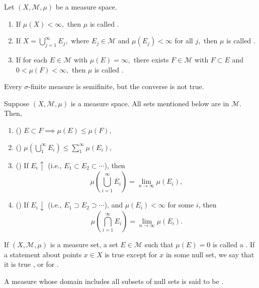 \documentclass[12pt]{article}	%
\begin{document}
\begin{defn}
	Let $(X, \mathcal{M}, \mu)$ be a measure space.
	\begin{enumerate}
		\item If $\mu(X) < \infty,$ then $\mu$ is called .
		\item If $X = \bigcup_{j = 1}^\infty E_j,$ where $E_j \in \mathcal{M}$ and $\mu(E_j) < \infty$ for all $j,$ then $\mu$ is called .
		\item If for each $E \in \mathcal{M}$ with $\mu(E) = \infty,$ there exists $F \in \mathcal{M}$ with $F \subset E$ and $0 < \mu(F) < \infty,$ then $\mu$ is called .
	\end{enumerate}
\end{defn}

\begin{exe}
	Every $\sigma$-finite measure is semifinite, but the converse is not true.
\end{exe}

\begin{prop}
	Suppose $(X, \mathcal{M}, \mu)$ is a measure space. All sets mentioned below are in $\mathcal{M}.$ Then,
	\begin{enumerate}
		\item () $E \subset F \implies \mu(E) \le \mu(F),$
		\item () $\mu\left(\bigcup_{1}^\infty E_i\right) \le \sum_{1}^{\infty} \mu(E_i),$
		\item () If $E_i \uparrow$ (i.e., $E_1 \subset E_2 \subset \cdots$), then
		\begin{equation*} 
			\mu\left(\bigcup_{i = 1}^\infty E_i\right) = \lim_{n\to \infty} \mu(E_i),
		\end{equation*}
		\item () If $E_i \downarrow$ (i.e., $E_1 \supset E_2 \supset \cdots$), and $\mu(E_{i}) < \infty$ for some $i$, then
		\begin{equation*} 
			\mu\left(\bigcap_{i = 1}^\infty E_i\right) = \lim_{n\to \infty} \mu(E_i).
		\end{equation*}
	\end{enumerate}
\end{prop}

\begin{defn}
	If $(X, \mathcal{M}, \mu)$ is a measure set, a set $E \in \mathcal{M}$ such that $\mu(E) = 0$ is called a . If a statement about points $x \in X$ is true except for $x$ in some null set, we say that it is true , or for .

	A measure whose domain includes all subsets of null sets is said to be .
\end{defn}
\end{document}
